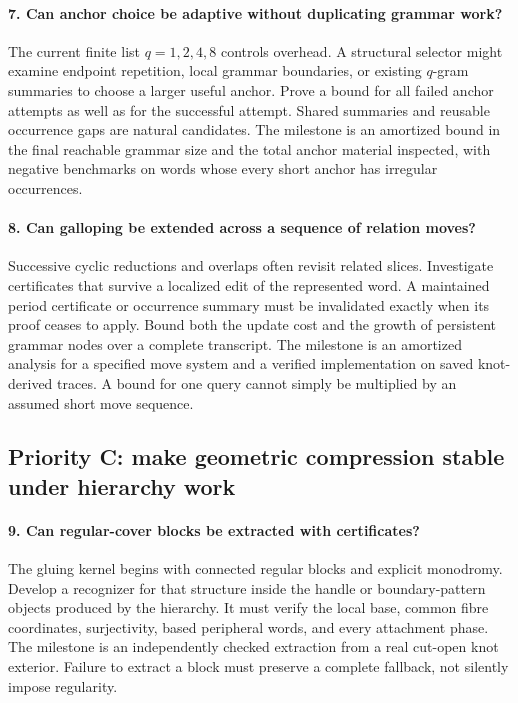 \paragraph{7. Can anchor choice be adaptive without duplicating grammar work?}
The current finite list $q=1,2,4,8$ controls overhead. A structural selector
might examine endpoint repetition, local grammar boundaries, or existing
$q$-gram summaries to choose a larger useful anchor. Prove a bound for
all failed anchor attempts as well as for the successful attempt. Shared
summaries and reusable occurrence gaps are natural candidates. The
milestone is an amortized bound in the final reachable grammar size and
the total anchor material inspected, with negative benchmarks on words
whose every short anchor has irregular occurrences.

\paragraph{8. Can galloping be extended across a sequence of relation moves?}
Successive cyclic reductions and overlaps often revisit related slices.
Investigate certificates that survive a localized edit of the represented
word. A maintained period certificate or occurrence summary must be
invalidated exactly when its proof ceases to apply. Bound both the update
cost and the growth of persistent grammar nodes over a complete transcript.
The milestone is an amortized analysis for a specified move system and a
verified implementation on saved knot-derived traces. A bound for one query
cannot simply be multiplied by an assumed short move sequence.

\subsection{Priority C: make geometric compression stable under hierarchy work}

\paragraph{9. Can regular-cover blocks be extracted with certificates?}
The gluing kernel begins with connected regular blocks and explicit
monodromy. Develop a recognizer for that structure inside the handle or
boundary-pattern objects produced by the hierarchy. It must verify the
local base, common fibre coordinates, surjectivity, based peripheral words,
and every attachment phase. The milestone is an independently checked
extraction from a real cut-open knot exterior. Failure to extract a block
must preserve a complete fallback, not silently impose regularity.

